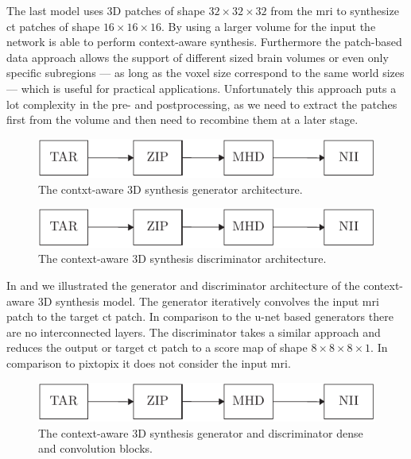 The last model uses 3D patches of shape $32\times32\times32$ from the
\gls{mri} to synthesize \gls{ct} patches of shape $16\times16\times16$. By
using a larger volume for the input the network is able to perform
context-aware synthesis. Furthermore the patch-based data approach allows the
support of different sized brain volumes or even only specific subregions ---
as long as the voxel size correspond to the same world sizes --- which is
useful for practical applications. Unfortunately this approach puts a lot
complexity in the pre- and postprocessing, as we need to extract the patches
first from the volume and then need to recombine them at a later stage.
\begin{figure}[h]
  \centering
  \includegraphics[page=7,width=\linewidth]{figure/diagrams.pdf}
  \caption{The contxt-aware 3D synthesis generator architecture.
  }\label{fig:synthesis:gen}
\end{figure}
\begin{figure}[h]
  \centering
  \includegraphics[page=8,width=\linewidth]{figure/diagrams.pdf}
  \caption{The context-aware 3D synthesis discriminator architecture.
	}\label{fig:synthesis:disc}
\end{figure}
In  and  we illustrated the
generator and discriminator architecture of the context-aware 3D synthesis
model. The generator iteratively convolves the input \gls{mri} patch to the
target \gls{ct} patch. In comparison to the u-net based generators there
are no interconnected layers. The discriminator takes a similar approach and
reduces the output or target \gls{ct} patch to a score map of shape
$8\times8\times8\times1$. In comparison to pixtopix it does not consider the
input \gls{mri}.
\begin{figure}[h]
  \centering
  \includegraphics[page=9,width=\linewidth]{figure/diagrams.pdf}
  \caption{The context-aware 3D synthesis generator and discriminator dense
    and convolution blocks.
	}\label{fig:synthesis:blocks}
\end{figure}
